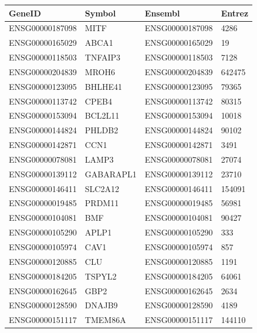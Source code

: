 \begingroup
\tiny
\setlength{\tabcolsep}{2pt}
\renewcommand{\arraystretch}{1.18}
\begin{tabular}{@{}llll@{}}
\toprule
GeneID & Symbol & Ensembl & Entrez \\
\midrule
ENSG00000187098 & MITF & ENSG00000187098 & 4286 \\
ENSG00000165029 & ABCA1 & ENSG00000165029 & 19 \\
ENSG00000118503 & TNFAIP3 & ENSG00000118503 & 7128 \\
ENSG00000204839 & MROH6 & ENSG00000204839 & 642475 \\
ENSG00000123095 & BHLHE41 & ENSG00000123095 & 79365 \\
ENSG00000113742 & CPEB4 & ENSG00000113742 & 80315 \\
ENSG00000153094 & BCL2L11 & ENSG00000153094 & 10018 \\
ENSG00000144824 & PHLDB2 & ENSG00000144824 & 90102 \\
ENSG00000142871 & CCN1 & ENSG00000142871 & 3491 \\
ENSG00000078081 & LAMP3 & ENSG00000078081 & 27074 \\
ENSG00000139112 & GABARAPL1 & ENSG00000139112 & 23710 \\
ENSG00000146411 & SLC2A12 & ENSG00000146411 & 154091 \\
ENSG00000019485 & PRDM11 & ENSG00000019485 & 56981 \\
ENSG00000104081 & BMF & ENSG00000104081 & 90427 \\
ENSG00000105290 & APLP1 & ENSG00000105290 & 333 \\
ENSG00000105974 & CAV1 & ENSG00000105974 & 857 \\
ENSG00000120885 & CLU & ENSG00000120885 & 1191 \\
ENSG00000184205 & TSPYL2 & ENSG00000184205 & 64061 \\
ENSG00000162645 & GBP2 & ENSG00000162645 & 2634 \\
ENSG00000128590 & DNAJB9 & ENSG00000128590 & 4189 \\
ENSG00000151117 & TMEM86A & ENSG00000151117 & 144110 \\
\bottomrule
\end{tabular}
\endgroup
